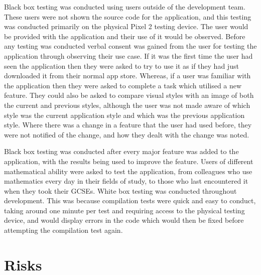 \documentclass{article}
\begin{document}
Black box testing was conducted using users outside of the development team. These users were not shown the source code for the application, and this testing was conducted primarily on the physical Pixel 2 testing device. The user would be provided with the application and their use of it would be observed. Before any testing was conducted verbal consent was gained from the user for testing the application through observing their use case. If it was the first time the user had seen the application then they were asked to try to use it as if they had just downloaded it from their normal app store. Whereas, if a user was familiar with the application then they were asked to complete a task which utilised a new feature. They could also be asked to compare visual styles with an image of both the current and previous styles, although the user was not made aware of which style was the current application style and which was the previous application style. Where there was a change in a feature that the user had used before, they were not notified of the change, and how they dealt with the change was noted. \par

Black box testing was conducted after every major feature was added to the application, with the results being used to improve the feature. Users of different mathematical ability were asked to test the application, from colleagues who use mathematics every day in their fields of study, to those who last encountered it when they took their GCSEs. White box testing was conducted throughout development. This was because compilation tests were quick and easy to conduct, taking around one minute per test and requiring access to the physical testing device, and would display errors in the code which would then be fixed before attempting the compilation test again. \par

\section{Risks}
\label{section:risks}
\end{document}
